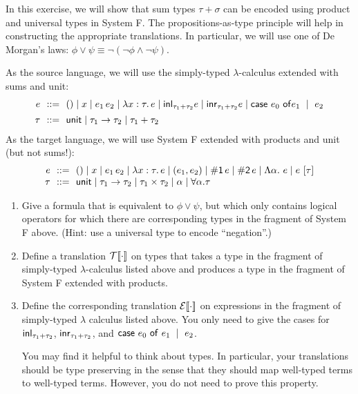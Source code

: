 \documentclass[10pt]{article}
\begin{document}
\begin{exercise} 

In this exercise, we will show that sum types $\tau + \sigma$
can be encoded using product and universal types in System F. The
propositions-as-type principle will help in constructing the
appropriate translations. In particular, we will use one of De
Morgan's laws: $\phi \vee \psi \equiv \neg (\neg \phi \wedge \neg \psi)$.

As the source language, we will use the simply-typed
$\lambda$-calculus extended with sums and unit:
%
\[
\begin{array}{r@{~~}c@{~~}l}
e    &::=& () \mid x \mid e_1\,e_2 \mid \lam{x:\tau}{e} \mid
           \lamfnt{inl}_{\tau_1+\tau_2} e \mid \lamfnt{inr}_{\tau_1+\tau_2} e \mid \lamfnt{case}~e_0~\lamfnt{of}e_1~\mid~{e_2}\\[1ex]
\tau &::=& \lamfnt{unit} \mid \tau_1 \arrow \tau_2 \mid \tau_1 + \tau_2\\
\end{array}
\]
%
As the target language, we will use System F extended with products
and unit (but not sums!):
%
\[
\begin{array}{r@{~~}c@{~~}l}
e    &::=& () \mid x \mid e_1\,e_2 \mid \lam{x:\tau}{e} \mid
           (e_1, e_2) \mid \lamfnt{\#1}\,e \mid \lamfnt{\#2}\,e \mid 
           \Lambda \alpha.~e \mid e~[\tau] \\
\tau &::=& \lamfnt{unit} \mid \tau_1 \arrow \tau_2 \mid \tau_1 \times \tau_2 \mid \alpha \mid \forall \alpha . \tau\\
\end{array}
\]

\begin{enumerate}
\item Give a formula that is equivalent to $\phi \vee \psi$, but which
  only contains logical operators for which there are corresponding
  types in the fragment of System F above.  (Hint: use a universal
  type to encode ``negation''.)

\item Define a translation ${\cal T}[\![\cdot]\!]$ on types that takes a type
  in the fragment of simply-typed $\lambda$-calculus listed above and
  produces a type in the fragment of System F extended with products. 

\item Define the corresponding translation ${\cal E}[\![\cdot]\!]$ on
  expressions in the fragment of simply-typed $\lambda$ calculus
  listed above. You only need to give the cases for
  $\mathsf{inl}_{\tau_1+\tau_2}$, $\mathsf{inr}_{\tau_1+\tau_2}$, and
  $\mathsf{case}~{e_0}~\mathsf{of}~{e_1}~\mid~{e_2}$. 

  You may find it helpful to think about types.  In particular, your
  translations should be type preserving in the sense that they should
  map well-typed terms to well-typed terms. However, you do not need
  to prove this property.

\end{enumerate}
\end{exercise}
\end{document}
